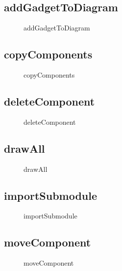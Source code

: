 \documentclass[12pt]{article}
\begin{document}
\subsection{addGadgetToDiagram}
\begin{figure}[H]
  \centering
    
  \caption{addGadgetToDiagram}
\end{figure}


\subsection{copyComponents}
\begin{figure}[H]
  \centering
    
  \caption{copyComponents}
\end{figure}


\subsection{deleteComponent}
\begin{figure}[H]
  \centering
    
  \caption{deleteComponent}
\end{figure}



\subsection{drawAll}
\begin{figure}[H]
  \centering
    
  \caption{drawAll}
\end{figure}

\subsection{importSubmodule}
\begin{figure}[H]
  \centering
    
  \caption{importSubmodule}
\end{figure}

\subsection{moveComponent}
\begin{figure}[H]
  \centering
    
  \caption{moveComponent}
\end{figure}
\end{document}
